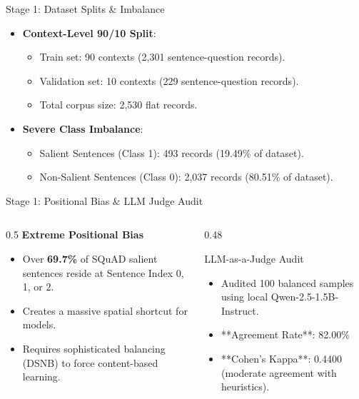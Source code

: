 \documentclass[aspectratio=169]{beamer}
\begin{document}
\begin{frame}{Stage 1: Dataset Splits \& Imbalance}
    \begin{itemize}
        \item \textbf{Context-Level 90/10 Split}:
            \begin{itemize}
                \item Train set: 90 contexts (2,301 sentence-question records).
                \item Validation set: 10 contexts (229 sentence-question records).
                \item Total corpus size: 2,530 flat records.
            \end{itemize}
        \vspace{0.4cm}
        \item \textbf{Severe Class Imbalance}:
            \begin{itemize}
                \item Salient Sentences (Class 1): 493 records (19.49\% of dataset).
                \item Non-Salient Sentences (Class 0): 2,037 records (80.51\% of dataset).
            \end{itemize}
    \end{itemize}
\end{frame}

\begin{frame}{Stage 1: Positional Bias \& LLM Judge Audit}
    \begin{columns}
        \begin{column}{0.5\textwidth}
            \textbf{Extreme Positional Bias}
            \begin{itemize}
                \item Over \textbf{69.7\%} of SQuAD salient sentences reside at Sentence Index 0, 1, or 2.
                \item Creates a massive spatial shortcut for models.
                \item Requires sophisticated balancing (DSNB) to force content-based learning.
            \end{itemize}
        \end{column}
        
        \begin{column}{0.48\textwidth}
            \begin{block}{LLM-as-a-Judge Audit}
                \begin{itemize}
                    \item Audited 100 balanced samples using local Qwen-2.5-1.5B-Instruct.
                    \item **Agreement Rate**: 82.00\%
                    \item **Cohen's Kappa**: 0.4400 (moderate agreement with heuristics).
                \end{itemize}
            \end{block}
        \end{column}
    \end{columns}
\end{frame}
\end{document}
